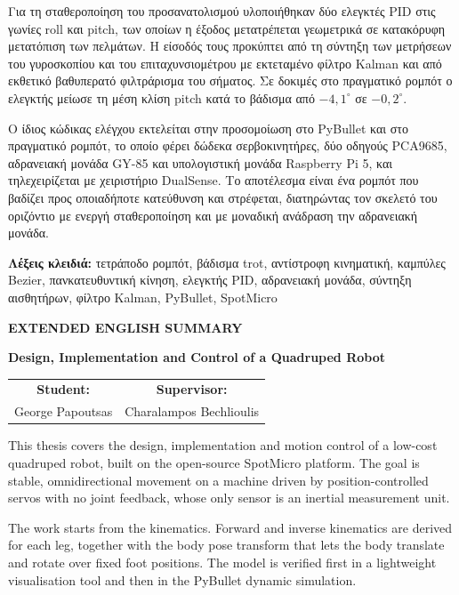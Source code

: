 \documentclass[11pt]{report}
\begin{document}
Για τη σταθεροποίηση του προσανατολισμού υλοποιήθηκαν δύο ελεγκτές PID στις
γωνίες roll και pitch, των οποίων η έξοδος μετατρέπεται γεωμετρικά σε
κατακόρυφη μετατόπιση των πελμάτων. Η είσοδός τους προκύπτει από τη σύντηξη των
μετρήσεων του γυροσκοπίου και του επιταχυνσιομέτρου με εκτεταμένο φίλτρο Kalman
και από εκθετικό βαθυπερατό φιλτράρισμα του σήματος. Σε δοκιμές στο πραγματικό ρομπότ
ο ελεγκτής μείωσε τη μέση κλίση pitch κατά το βάδισμα από $-4{,}1^\circ$ σε
$-0{,}2^\circ$.

Ο ίδιος κώδικας ελέγχου εκτελείται στην προσομοίωση στο PyBullet και στο
πραγματικό ρομπότ, το οποίο φέρει δώδεκα σερβοκινητήρες, δύο οδηγούς PCA9685,
αδρανειακή μονάδα GY-85 και υπολογιστική μονάδα Raspberry Pi 5, και
τηλεχειρίζεται με χειριστήριο DualSense. Το αποτέλεσμα είναι ένα ρομπότ που
βαδίζει προς οποιαδήποτε κατεύθυνση και στρέφεται, διατηρώντας τον σκελετό του
οριζόντιο με ενεργή σταθεροποίηση και με μοναδική ανάδραση την αδρανειακή
μονάδα.

\vspace{1em}
\noindent\textbf{Λέξεις κλειδιά:} τετράποδο ρομπότ, βάδισμα trot, αντίστροφη
κινηματική, καμπύλες Bezier, πανκατευθυντική κίνηση, ελεγκτής PID, αδρανειακή
μονάδα, σύντηξη αισθητήρων, φίλτρο Kalman, PyBullet, SpotMicro
\newpage

\thispagestyle{empty}
\begin{center}
    \textbf{\Large EXTENDED ENGLISH SUMMARY}

    \textbf{Design, Implementation and Control of a Quadruped Robot}
\end{center}

\begin{center}
\begin{tabular}{cc}
    \textbf{Student:} & \textbf{Supervisor:} \\
    George Papoutsas & Charalampos Bechlioulis \\
\end{tabular}
\end{center}

\vspace{1em}
This thesis covers the design, implementation and motion control of a low-cost
quadruped robot, built on the open-source SpotMicro platform. The goal is
stable, omnidirectional movement on a machine driven by position-controlled
servos with no joint feedback, whose only sensor is an inertial measurement
unit.

The work starts from the kinematics. Forward and inverse kinematics are derived
for each leg, together with the body pose transform that lets the body
translate and rotate over fixed foot positions. The model is verified first in
a lightweight visualisation tool and then in the PyBullet dynamic simulation.
\end{document}
